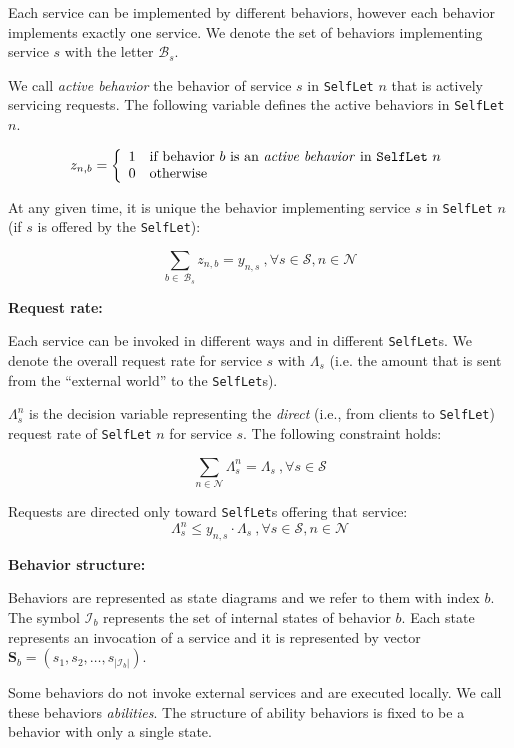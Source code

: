 \documentclass[11pt]{amsart}
\newcommand{\slet}{\texttt{SelfLet}}
\newcommand{\moreslet}{\texttt{SelfLet}s}
\begin{document}
Each service can be implemented by different behaviors, however each behavior implements exactly one service. We denote the set of behaviors implementing service $s$ with the letter $\mathcal{B}_s$.

We call \emph{active behavior} the behavior of service $s$ in \slet{} $n$ that is actively servicing requests.
The following variable defines the active behaviors in \slet{} $n$.

$$
z_{n,b} = \left\{ 
	\begin{array}{rl}
	1 & \mbox{if behavior $b$ is an \emph{active behavior} in \slet{} $n$} \\
	0 & \mbox{otherwise} 
	\end{array} \right.
$$


At any given time, it is unique the behavior implementing service $s$ in \slet{} $n$ (if $s$ is offered by the \slet{}):

$$
	\sum_{b \in \: \mathcal{B}_s} z_{n,b} = y_{n,s} \:, \forall s \in \mathcal{S}, n \in \mathcal{N}
$$

 
{\bf Request rate:}

Each service can be invoked in different ways and in different \moreslet{}. We denote the  overall request rate for service $s$ with $\Lambda_s$ (i.e. the amount that is sent from the ``external world'' to the \moreslet{}).

$\Lambda_{s}^{n}$ is the decision variable representing the \emph{direct} (i.e., from clients to \slet{}) request rate of \slet{} $n$ for service $s$. The following constraint holds:

$$
\sum_{n \in \mathcal{N}}\Lambda_{s}^{n} = \Lambda_s \:, \forall s \in \mathcal{S}
$$

Requests are directed only toward \moreslet{} offering that service:
$$
\Lambda_s^n \leq y_{n,s} \cdot \Lambda_s    \:, \forall s \in \mathcal{S}, n \in \mathcal{N}
$$

{\bf Behavior structure:}

Behaviors are represented as state diagrams and we refer to them with index $b$. The symbol $\mathcal{I}_b$ represents the set of internal states of behavior $b$.
Each state represents an invocation of a service and it is represented by vector $\mathbf{S}_b = (s_1, s_2,  \dots , s_{|\mathcal{I}_b|})$. 

Some behaviors do not invoke external services and are executed locally. We call these behaviors \emph{abilities}. The structure of ability behaviors is fixed to be a behavior with only a single state.
\end{document}
